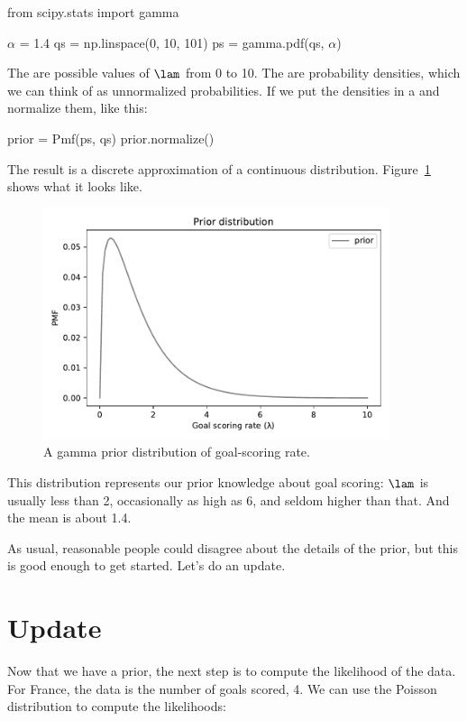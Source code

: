 \documentclass[12pt]{book}
\theoremstyle{exercise}
\begin{document}
\newcommand{\alf}{\mathtt{\alpha}}

\begin{code}
from scipy.stats import gamma

$\alf$ = 1.4
qs = np.linspace(0, 10, 101)
ps = gamma.pdf(qs, $\alf$)
\end{code}

The  are possible values of $\lam$ from 0 to 10.
The  are probability densities, which we can think of as unnormalized probabilities.
If we put the densities in a  and normalize them, like this:

\begin{code}
prior = Pmf(ps, qs)
prior.normalize()
\end{code}

The result is a discrete approximation of a continuous distribution.
Figure~\ref{fig07-02} shows what it looks like.

\begin{figure}
\centerline{\includegraphics[width=4in]{figs/fig07-02.pdf}}
\caption{A gamma prior distribution of goal-scoring rate.}
\label{fig07-02}
\end{figure}

This distribution represents our prior knowledge about goal scoring: $\lam$ is usually less than 2, occasionally as high as 6, and seldom higher than that.  And the mean is about 1.4.

As usual, reasonable people could disagree about the details of the prior, but this is good enough to get started.  
Let's do an update.



\section{Update}

Now that we have a prior, the next step is to compute the likelihood of the data.
For France, the data is the number of goals scored, 4.
We can use the Poisson distribution to compute the likelihoods:
\end{document}
